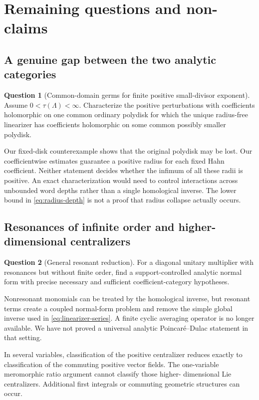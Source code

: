 \documentclass[11pt,letterpaper]{article}
\theoremstyle{definition}
\newtheorem{question}[question]{Question}
\theoremstyle{remark}
\numberwithin{equation}{section}
\begin{document}
\section{Remaining questions and non-claims}\label{sec:limitations}

\subsection{A genuine gap between the two analytic categories}
\begin{question}[Common-domain germs for finite positive small-divisor exponent]
\label{q:common-germ}
Assume $0<\tau(\Lambda)<\infty$. Characterize the positive perturbations
with coefficients holomorphic on one common ordinary polydisk for which the
unique radius-free linearizer has coefficients holomorphic on some common
possibly smaller polydisk.
\end{question}
Our fixed-disk counterexample shows that the original polydisk may be lost.
Our coefficientwise estimates guarantee a positive radius for each fixed
Hahn coefficient. Neither statement decides whether the infimum of all
these radii is positive. An exact characterization would need to control
interactions across unbounded word depths rather than a single homological
inverse. The lower bound in \eqref{eq:radius-depth} is not a proof that
radius collapse actually occurs.

\subsection{Resonances of infinite order and higher-dimensional centralizers}
\begin{question}[General resonant reduction]
For a diagonal unitary multiplier with resonances but without finite order,
find a support-controlled analytic normal form with precise necessary and
sufficient coefficient-category hypotheses.
\end{question}
Nonresonant monomials can be treated by the homological inverse, but resonant
terms create a coupled normal-form problem and remove the simple global
inverse used in \eqref{eq:linearizer-series}. A finite cyclic averaging
operator is no longer available. We have not proved a universal analytic
Poincar\'e--Dulac statement in that setting.

In several variables, classification of the positive centralizer reduces
exactly to classification of the commuting positive vector fields. The
one-variable meromorphic ratio argument cannot classify those higher-
dimensional Lie centralizers. Additional first integrals or commuting
geometric structures can occur.
\end{document}
